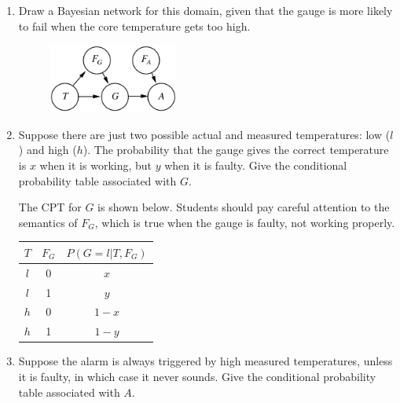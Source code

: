 \documentclass[11pt, a4paper]{article}
\begin{document}
\begin{enumerate}
    \item Draw a Bayesian network for this domain, given that the gauge is more likely to fail when the core temperature gets too high.

    \begin{solution}
        \begin{figure}[h]
            \centering
            \includegraphics[width=0.4\textwidth]{figures/e3_nuclear.png}
        \end{figure}
    \end{solution}

    \item Suppose there are just two possible actual and measured temperatures: low ($l$) and high ($h$). The probability that the gauge gives the correct temperature is $x$ when it is working, but $y$ when it is faulty. Give the conditional probability table associated with $G$.

    \begin{solution}
        The CPT for $G$ is shown below. Students should pay careful attention to the semantics of $F_G$, which is true when the gauge is faulty, \ie{} not working properly.
        \begin{table}[h]
            \centering
            \begin{tabular}{cc|c}
                \toprule
                 $T$ & $F_G$ & $P(G = l | T, F_G)$ \\
                 \midrule
                 $l$ & 0 & $x$ \\
                 $l$ & 1 & $y$ \\
                 $h$ & 0 & $1 - x$ \\
                 $h$ & 1 & $1 - y$ \\
                 \bottomrule
            \end{tabular}
        \end{table}
    \end{solution}

    \item Suppose the alarm is always triggered by high measured temperatures, unless it is faulty, in which case it never sounds. Give the conditional probability table associated with $A$.


\end{enumerate}
\end{document}
